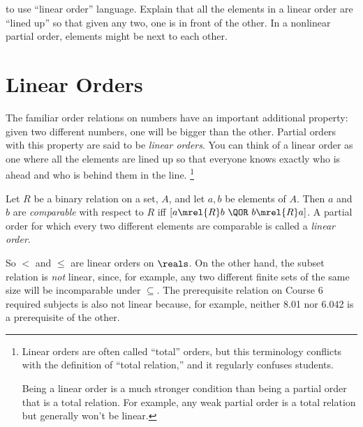 \begin{editingnotes}
 to use ``linear order'' language.  Explain that all the
elements in a linear order are ``lined up'' so that given any two, one
is in front of the other.  In a nonlinear partial order, elements
might be next to each other.
\end{editingnotes}

\section{Linear Orders}

The familiar order relations on numbers have an important additional
property: given two different numbers, one will be bigger than the
other.  Partial orders with this property are said to be \emph{linear
  orders}.  You can think of a linear order as one where all the
elements are lined up so that everyone knows exactly who is ahead and
who is behind them in the line.
\footnote{Linear orders are often called ``total'' orders, but this
  terminology conflicts with the definition of ``total relation,'' and
  it regularly confuses students.

  Being a linear order is a much stronger condition than being a
  partial order that is a total relation.  For example, any weak
  partial order is a total relation but generally won't be linear.}

\begin{definition}\label{def:path_total}
Let $R$ be a binary relation on a set, $A$, and let $a, b$ be elements of
$A$.  Then $a$ and $b$ are \emph{comparable} with respect to $R$ iff $[a
  \mrel{R} b\ \QOR\ b \mrel{R} a]$.  A partial order for which every two
different elements are comparable is called a \emph{linear order}.
\end{definition}

So $<$ and $\le$ are linear orders on $\reals$.  On the other hand, the
subset relation is \emph{not} linear, since, for example, any two different
finite sets of the same size will be incomparable under $\subseteq$.  The
prerequisite relation on Course 6 required subjects is also not linear
because, for example, neither 8.01 nor 6.042 is a prerequisite of the
other.

\iffalse
The name linear is based on the following
\begin{lemma}\label{path_total_lem} For any
  finite, nonempty set of vertices from a linear order, there is
  a directed path going through exactly these vertices.  If
  the digraph is a DAG, the directed path is unique.
\end{lemma}
Lemma~\ref{path_total_lem} is easy to prove by induction on the size
of the set of vertices.  The proof is given in
Problem~\ref{CP_tournament_chain}.
\fi

